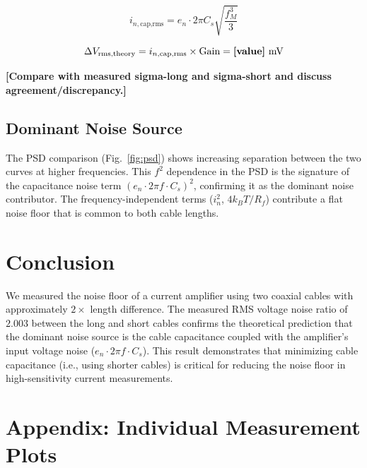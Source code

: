 \documentclass[11pt,a4paper]{article}
\newcommand{\placeholder}[1]{\textbf{[#1]}}
\begin{document}
\begin{equation}
  i_{n,\text{cap,rms}} = e_n \cdot 2\pi C_s \sqrt{\frac{f_M^3}{3}}
\end{equation}

\begin{equation}
  \Delta V_{\text{rms,theory}} = i_{n,\text{cap,rms}} \times \text{Gain}
    = \text{\placeholder{value}}~\si{mV}
\end{equation}

\placeholder{Compare with measured sigma-long and sigma-short and discuss agreement/discrepancy.}

\subsection{Dominant Noise Source}

The PSD comparison (Fig.~\ref{fig:psd}) shows increasing separation between
the two curves at higher frequencies. This $f^2$ dependence in the PSD is
the signature of the capacitance noise term $(e_n \cdot 2\pi f \cdot C_s)^2$,
confirming it as the dominant noise contributor. The frequency-independent
terms ($i_n^2$, $4k_BT/R_f$) contribute a flat noise floor that is common
to both cable lengths.

\section{Conclusion}

We measured the noise floor of a current amplifier using two coaxial cables
with approximately $2\times$ length difference. The measured RMS voltage
noise ratio of $2.003$ between the long and short cables confirms the
theoretical prediction that the dominant noise source is the cable
capacitance coupled with the amplifier's input voltage noise ($e_n \cdot
2\pi f \cdot C_s$). This result demonstrates that minimizing cable
capacitance (i.e., using shorter cables) is critical for reducing the noise
floor in high-sensitivity current measurements.

\newpage
\section*{Appendix: Individual Measurement Plots}
\end{document}
